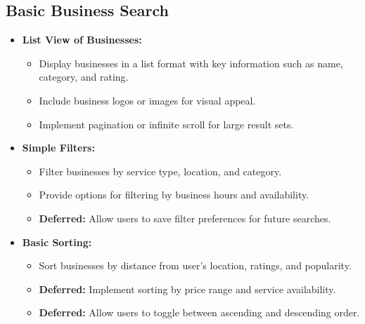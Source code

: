 \subsection{Basic Business Search}
\begin{itemize}[leftmargin=*]
    \item \textbf{List View of Businesses:}
    \begin{itemize}
        \item Display businesses in a list format with key information such as name, category, and rating.
        \item Include business logos or images for visual appeal.
        \item Implement pagination or infinite scroll for large result sets.
    \end{itemize}
    
    \item \textbf{Simple Filters:}
    \begin{itemize}
        \item Filter businesses by service type, location, and category.
        \item Provide options for filtering by business hours and availability.
        \item \textbf{Deferred:} Allow users to save filter preferences for future searches.
    \end{itemize}
    
    \item \textbf{Basic Sorting:}
    \begin{itemize}
        \item Sort businesses by distance from user's location, ratings, and popularity.
        \item \textbf{Deferred:} Implement sorting by price range and service availability.
        \item \textbf{Deferred:} Allow users to toggle between ascending and descending order.
    \end{itemize}
\end{itemize}

